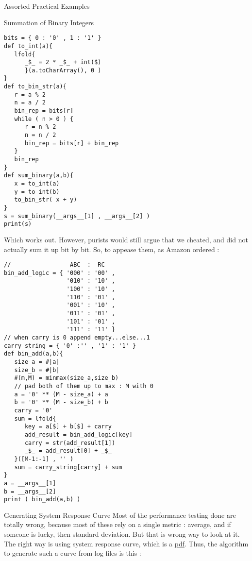 \begin{section}{Assorted Practical Examples}
\begin{subsection}{Summation of Binary Integers}
\begin{center}\begin{minipage}{\linewidth}
\begin{lstlisting}[style=JexlStyle]
bits = { 0 : '0' , 1 : '1' } 
def to_int(a){
   lfold{  
      _$_ = 2 * _$_ + int($)  
      }(a.toCharArray(), 0 )
} 
def to_bin_str(a){
   r = a % 2
   n = a / 2 
   bin_rep = bits[r]
   while ( n > 0 ) {
      r = n % 2 
      n = n / 2 
      bin_rep = bits[r] + bin_rep 
   }
   bin_rep 
} 
def sum_binary(a,b){
   x = to_int(a)
   y = to_int(b)
   to_bin_str( x + y)
}
s = sum_binary(__args__[1] , __args__[2] )
print(s)
\end{lstlisting}  
\end{minipage}\end{center}
Which works out. However, purists would still argue that we cheated, 
and did not actually sum it up bit by bit. So, to appease them, as Amazon ordered :

\begin{center}\begin{minipage}{\linewidth}
\begin{lstlisting}[style=JexlStyle]
//                 ABC  :  RC
bin_add_logic = { '000' : '00' ,
                  '010' : '10' ,
                  '100' : '10' ,
                  '110' : '01' ,
                  '001' : '10' ,
                  '011' : '01' ,
                  '101' : '01' ,
                  '111' : '11' }
// when carry is 0 append empty...else...1
carry_string = { '0' :'' , '1' : '1' } 
def bin_add(a,b){
   size_a = #|a|
   size_b = #|b|
   #(m,M) = minmax(size_a,size_b)
   // pad both of them up to max : M with 0
   a = '0' ** (M - size_a) + a
   b = '0' ** (M - size_b) + b
   carry = '0'
   sum = lfold{
      key = a[$] + b[$] + carry
      add_result = bin_add_logic[key]
      carry = str(add_result[1])
      _$_ = add_result[0] + _$_ 
   }([M-1:-1] , '' )
   sum = carry_string[carry] + sum 
}
a = __args__[1]
b = __args__[2]
print ( bin_add(a,b) )
\end{lstlisting}  
\end{minipage}\end{center}


\end{subsection}

\begin{subsection}{Generating System Response Curve}
Most of the performance testing done are totally wrong, because 
most of these rely on a single metric : average, and if someone is lucky, 
then standard deviation. But that is wrong way to look at it.
The right way is using system response curve, which is a 
\href{https://en.wikipedia.org/wiki/Probability\_distribution\_function}{pdf}.
Thus, the algorithm to generate such a curve from log files is this :


\end{subsection}
\end{section}
